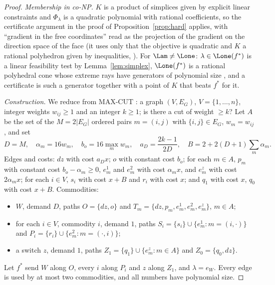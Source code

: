 \begin{proof}
\emph{Membership in co-NP.} $K$ is a product of simplices given by explicit linear constraints and $\Phi_\lambda$ is a quadratic polynomial with rational coefficients, so the certificate argument in the proof of Proposition~\ref{prop:hard} applies, with ``gradient in the free coordinates'' read as the projection of the gradient on the direction space of the face (it uses only that the objective is quadratic and $K$ a rational polyhedron given by inequalities, \citealp{vavasis1990}). For $\Lam\ne\Lone$: $\lambda\in\Lone(f^*)$ is a linear feasibility test by Lemma~\ref{lem:simplex}, $\Lone(f^*)$ is a rational polyhedral cone whose extreme rays have generators of polynomial size \citep[Ch.~10]{schrijver1986}, and a certificate is such a generator together with a point of $K$ that beats $f^*$ for it.

\emph{Construction.} We reduce from MAX-CUT \citep{karp1972}: a graph $(V,E_G)$, $V=\{1,\dots,n\}$, integer weights $w_{ij}\ge1$ and an integer $k\ge1$; is there a cut of weight $\ge k$? Let $A$ be the set of the $M=2|E_G|$ ordered pairs $m=(i,j)$ with $\{i,j\}\in E_G$, $w_m=w_{ij}$, and set
\[
D=M,\quad \alpha_m=16w_m,\quad b_o=16\max_mw_m,\quad a_D=\frac{2k-1}{2D},\quad B=2+2(D+1)\textstyle\sum_m\alpha_m .
\]
Edges and costs: $dz$ with cost $a_Dx$; $o$ with constant cost $b_o$; for each $m\in A$, $p_m$ with constant cost $b_o-\alpha_m\ge0$, $e^1_m$ and $e^2_m$ with cost $\alpha_mx$, and $e^z_m$ with cost $2\alpha_mx$; for each $i\in V$, $s_i$ with cost $x+B$ and $r_i$ with cost $x$; and $q_1$ with cost $x$, $q_0$ with cost $x+B$. Commodities:
\begin{itemize}[leftmargin=1.5em,itemsep=0pt]
\item $W$, demand $D$, paths $O=\{dz,o\}$ and $T_m=\{dz,p_m,e^1_m,e^2_m,e^z_m\}$, $m\in A$;
\item for each $i\in V$, commodity $i$, demand $1$, paths $S_i=\{s_i\}\cup\{e^1_m:m=(i,\cdot)\}$ and $P_i=\{r_i\}\cup\{e^2_m:m=(\cdot,i)\}$;
\item a switch $z$, demand $1$, paths $Z_1=\{q_1\}\cup\{e^z_m:m\in A\}$ and $Z_0=\{q_0,dz\}$.
\end{itemize}
Let $f^*$ send $W$ along $O$, every $i$ along $P_i$ and $z$ along $Z_1$, and $\lambda=e_W$. Every edge is used by at most two commodities, and all numbers have polynomial size.


\end{proof}
